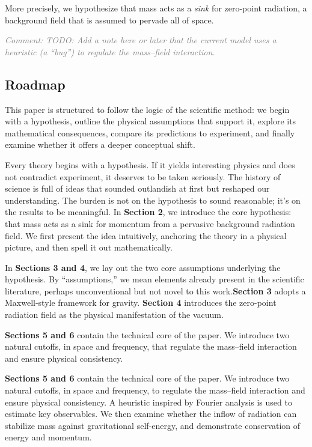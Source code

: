 \documentclass {article}
\newcommand{\comment}[1]{\textcolor{gray}{\small\textit{Comment: #1}}}
\begin{document}
More precisely, we hypothesize that mass acts as a \emph{sink} for zero-point radiation, a background field that is assumed to pervade all of space.

\comment{TODO: Add a note here or later that the current model uses a heuristic (a “bug”) to regulate the mass–field interaction.}



\subsection{Roadmap}

This paper is structured to follow the logic of the scientific method: we begin with a hypothesis, outline the physical assumptions that support it, explore its mathematical consequences, compare its predictions to experiment, and finally examine whether it offers a deeper conceptual shift.

Every theory begins with a hypothesis. If it yields interesting physics and does not contradict experiment, it deserves to be taken seriously. The history of science is full of ideas that sounded outlandish at first but reshaped our understanding. The burden is not on the hypothesis to sound reasonable; it’s on the results to be meaningful. In \textbf{Section 2}, we introduce the core hypothesis: that mass acts as a sink for momentum from a pervasive background radiation field. We first present the idea intuitively, anchoring the theory in a physical picture, and then spell it out mathematically.

In \textbf{Sections 3 and 4}, we lay out the two core assumptions underlying the hypothesis. By “assumptions,” we mean elements already present in the scientific literature, perhaps unconventional but not novel to this work.\textbf{Section 3} adopts a Maxwell-style framework for gravity. \textbf{Section 4} introduces the zero-point radiation field as the physical manifestation of the vacuum.

\textbf{Sections 5 and 6} contain the technical core of the paper. We introduce two natural cutoffs, in space and frequency, that regulate the mass–field interaction and ensure physical consistency. 

\textbf{Sections 5 and 6} contain the technical core of the paper. We introduce two natural cutoffs, in space and frequency, to regulate the mass–field interaction and ensure physical consistency. A heuristic inspired by Fourier analysis is used to estimate key observables. We then examine whether the inflow of radiation can stabilize mass against gravitational self-energy, and demonstrate conservation of energy and momentum.
\end{document}
